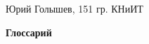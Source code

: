 \documentclass[14pt]{extarticle}
\begin{document}
\begin{flushright}
    Юрий Голышев, 151 гр. КНиИТ
\end{flushright}
\begin{center}
    \Large\textbf{Глоссарий}
\end{center}


\end{document}
